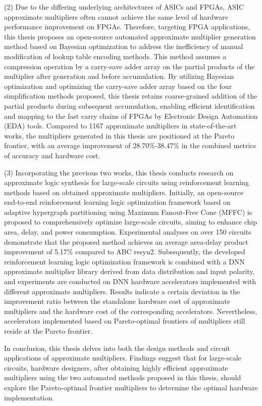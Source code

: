 \begin{abstract*}
    (2) Due to the differing underlying architectures of ASICs and FPGAs, ASIC approximate multipliers often cannot achieve the same level of hardware performance improvement on FPGAs. Therefore, targeting FPGA applications, this thesis proposes an open-source automated approximate multiplier generation method based on Bayesian optimization to address the inefficiency of manual modification of lookup table encoding methods. This method assumes a compression operation by a carry-save adder array on the partial products of the multiplier after generation and before accumulation. By utilizing Bayesian optimization and optimizing the carry-save adder array based on the four simplification methods proposed, this thesis retains coarse-grained addition of the partial products during subsequent accumulation, enabling efficient identification and mapping to the fast carry chains of FPGAs by Electronic Design Automation (EDA) tools. Compared to 1167 approximate multipliers in state-of-the-art works, the multipliers generated in this thesis are positioned at the Pareto frontier, with an average improvement of 28.70\%-38.47\% in the combined metrics of accuracy and hardware cost.

    (3) Incorporating the previous two works, this thesis conducts research on approximate logic synthesis for large-scale circuits using reinforcement learning methods based on obtained approximate multipliers. Initially, an open-source end-to-end reinforcement learning logic optimization framework based on adaptive hypergraph partitioning using Maximum Fanout-Free Cone (MFFC) is proposed to comprehensively optimize large-scale circuits, aiming to enhance chip area, delay, and power consumption. Experimental analyses on over 150 circuits demonstrate that the proposed method achieves an average area-delay product improvement of 5.17\% compared to ABC resyn2. Subsequently, the developed reinforcement learning logic optimization framework is combined with a DNN approximate multiplier library derived from data distribution and input polarity, and experiments are conducted on DNN hardware accelerators implemented with different approximate multipliers. Results indicate a certain deviation in the improvement ratio between the standalone hardware cost of approximate multipliers and the hardware cost of the corresponding accelerators. Nevertheless, accelerators implemented based on Pareto-optimal frontiers of multipliers still reside at the Pareto frontier.

    In conclusion, this thesis delves into both the design methods and circuit applications of approximate multipliers. Findings suggest that for large-scale circuits, hardware designers, after obtaining highly efficient approximate multipliers using the two automated methods proposed in this thesis, should explore the Pareto-optimal frontier multipliers to determine the optimal hardware implementation.
    
\end{abstract*}